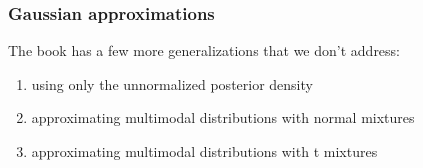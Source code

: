\documentclass{beamer}
\begin{document}
% 
% 

% 
% 


\begin{frame}[fragile]
\frametitle{Gaussian approximations}

The book has a few more generalizations that we don't address:

\begin{enumerate}
\item using only the unnormalized posterior density
\item approximating multimodal distributions with normal mixtures
\item approximating multimodal distributions with t mixtures
\end{enumerate}

\end{frame}
\end{document}
